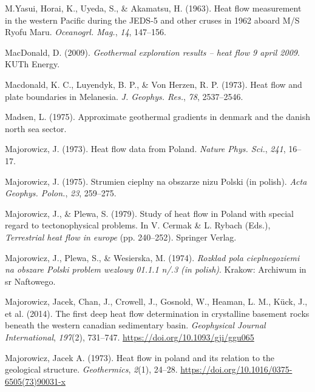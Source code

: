\documentclass[draft,linenumbers]{agujournal2018}
\begin{document}
\leavevmode{}%
M.Yasui, Horai, K., Uyeda, S., \& Akamatsu, H. (1963). Heat flow
measurement in the western {Pacific} during the {JEDS-5} and other
cruses in 1962 aboard {M/S Ryofu Maru}. \emph{Oceanogrl. Mag.},
\emph{14}, 147--156.

\leavevmode{}%
MacDonald, D. (2009). \emph{Geothermal exploration results -- heat flow
9 april 2009}. KUTh Energy.

\leavevmode{}%
Macdonald, K. C., Luyendyk, B. P., \& Von Herzen, R. P. (1973). Heat
flow and plate boundaries in {Melanesia}. \emph{J. Geophys. Res.},
\emph{78}, 2537--2546.

\leavevmode{}%
Madsen, L. (1975). Approximate geothermal gradients in denmark and the
danish north sea sector.

\leavevmode{}%
Majorowicz, J. (1973). Heat flow data from {Poland}. \emph{Nature Phys.
Sci.}, \emph{241}, 16--17.

\leavevmode{}%
Majorowicz, J. (1975). Strumien cieplny na obszarze nizu {Polski} (in
polish). \emph{Acta Geophys. Polon.}, \emph{23}, 259--275.

\leavevmode{}%
Majorowicz, J., \& Plewa, S. (1979). Study of heat flow in {Poland} with
special regard to tectonophysical problems. In V. Cermak \& L. Rybach
(Eds.), \emph{Terrestrial heat flow in europe} (pp. 240--252). Springer
Verlag.

\leavevmode{}%
Majorowicz, J., Plewa, S., \& Wesierska, M. (1974). \emph{Rozklad pola
cieplnegoziemi na obszare {Polski} problem wezlowy 01.1.1 n/.3 (in
polish)}. Krakow: Archiwum in sr Naftowego.

\leavevmode{}%
Majorowicz, Jacek, Chan, J., Crowell, J., Gosnold, W., Heaman, L. M.,
Kück, J., et al. (2014). The first deep heat flow determination in
crystalline basement rocks beneath the western canadian sedimentary
basin. \emph{Geophysical Journal International}, \emph{197}(2),
731--747. \url{https://doi.org/10.1093/gji/ggu065}

\leavevmode{}%
Majorowicz, Jacek A. (1973). Heat flow in poland and its relation to the
geological structure. \emph{Geothermics}, \emph{2}(1), 24--28.
\url{https://doi.org/10.1016/0375-6505(73)90031-x}
\end{document}

